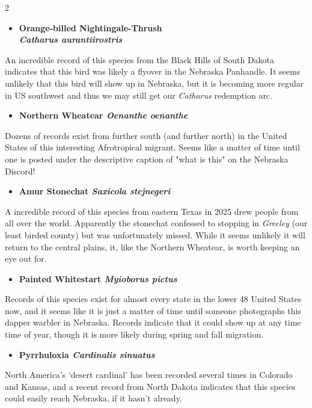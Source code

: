 \documentclass[10pt,letterpaper]{article}
\begin{document}
\begin{multicols}{2}
	\begin{itemize}
		\item \textbf{Orange-billed Nightingale-Thrush \\ \textit{Catharus aurantiirostris}}
	\end{itemize}
	An incredible record of this species from the Black Hills of South Dakota indicates that this bird was likely a flyover in the Nebraska Panhandle. It seems unlikely that this bird will show up in Nebraska, but it is becoming more regular in US southwest and thus we may still get our \textit{Catharus} redemption arc.
	
	\begin{itemize}
		\item \textbf{Northern Wheatear \textit{Oenanthe oenanthe}}
	\end{itemize}
	Dozens of records exist from further south (and further north) in the United States of this interesting Afrotropical migrant. Seems like a matter of time until one is posted under the descriptive caption of "what is this" on the Nebraska Discord!
	
	\begin{itemize}
		\item \textbf{Amur Stonechat \textit{Saxicola stejnegeri}}
	\end{itemize}
	A incredible record of this species from eastern Texas in 2025 drew people from all over the world. Apparently the stonechat confessed to stopping in \textit{Greeley} (our least birded county) but was unfortunately missed. While it seems unlikely it will return to the central plains, it, like the Northern Wheatear, is worth keeping an eye out for.
	
	\begin{itemize}
		\item \textbf{Painted Whitestart \textit{Myioborus pictus}}
	\end{itemize}
	Records of this species exist for almost every state in the lower 48 United States now, and it seems like it is just a matter of time until someone photographs this dapper warbler in Nebraska. Records indicate that it could show up at any time time of year, though it is more likely during spring and fall migration.
	
	\begin{itemize}
		\item \textbf{Pyrrhuloxia \textit{Cardinalis sinuatus}}
	\end{itemize}
	North America's `desert cardinal' has been recorded several times in Colorado and Kansas, and a recent record from North Dakota indicates that this species could easily reach Nebraska, if it hasn't already.
\end{multicols}
	
\end{document}
